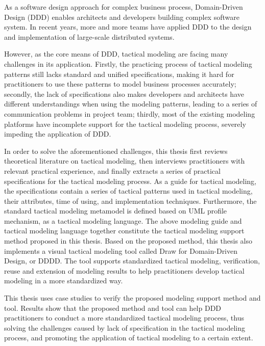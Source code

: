 \documentclass[macfonts,master,oneside]{njuthesis}
\begin{document}
\begin{englishabstract}
  As a software design approach for complex business process, Domain-Driven Design (DDD) enables architects and developers building complex software system.
  In recent years, more and more teams have applied DDD to the design and implementation of large-scale distributed systems.

  However, as the core means of DDD, 
  tactical modeling are facing many challenges in its application.
  Firstly, the practicing process of tactical modeling patterns still lacks standard and unified specifications,
   making it hard for practitioners to use these patterns to model business processes accurately; 
  secondly, the lack of specifications also makes developers and architects have different understandings when using the modeling patterns,
   leading to a series of communication problems in project team; 
   thirdly, most of the existing modeling platforms have incomplete support for the tactical modeling process, 
   severely impeding the application of DDD.


  In order to solve the aforementioned challenges, 
  this thesis first reviews theoretical literature on tactical modeling,
   then interviews practitioners with relevant practical experience, 
  and finally extracts a series of practical specifications for the tactical modeling process.
   As a guide for tactical modeling, the specifications contain a series of tactical patterns used in tactical modeling, 
   their attributes, time of using, and implementation techniques. 
   Furthermore, the standard tactical modeling metamodel is defined based on UML profile mechanism, as a tactical modeling language. 
   The above modeling guide and tactical modeling language together constitute the tactical modeling support method proposed in this thesis. 
   Based on the proposed method, this thesis also implements a visual tactical modeling tool called Draw for Domain-Driven Design, or DDDD. 
   The tool supports standardized tactical modeling, verification, reuse and extension of modeling results to help practitioners develop tactical modeling in a more standardized way.


  This thesis uses case studies to verify the proposed modeling support method and tool. 
  Results show that the proposed method and tool can help DDD practitioners to conduct a more standardized tactical modeling process, 
  thus solving the challenges caused by lack of specification in the tactical modeling process, 
  and promoting the application of tactical modeling to a certain extent.
  
\end{englishabstract}
\end{document}
